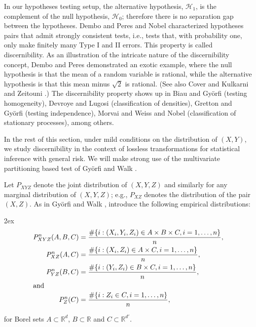\documentclass[11pt]{article}
\def\R{{\mathbb R}}
\begin{document}
In our hypotheses testing setup, the alternative hypothesis, $\mathcal{H}_1$, is the complement of the null hypothesis,  $\mathcal{H}_0$; 
therefore there is no separation gap between the hypotheses.
Dembo and Peres \cite{DePe94} and Nobel \cite{Nob06} characterized
hypotheses pairs that admit strongly  consistent tests, i.e.,  tests
that, with probability one, only make finitely many Type I and II
errors. 
This property is called discernibility.
As an illustration of the intricate nature of the discernibility concept,
Dembo and Peres \cite{DePe94} demonstrated an exotic example, where the null hypothesis is that the mean of a random variable is rational, while the alternative hypothesis is that this mean minus $\sqrt{2}$ is rational.
(See also  Cover \cite{Cov73} and Kulkarni and Zeitouni \cite{KuZe91}.)
The discernibility property shows up in
Biau and Gy\"orfi \cite{BiGy05} (testing homogeneity),
Devroye and Lugosi \cite{DeLu02} (classification of densities),
Gretton and Gy\"orfi \cite{GrGy10} (testing independence),
Morvai and Weiss \cite{MoWe21} and Nobel \cite{Nob06} (classification of stationary processes),
among others. 

In the rest of this section, under mild conditions on the distribution of $(X,Y)$, we study discernibility in the context of lossless transformations for statistical inference with general risk. We will  make strong use of the multivariate partitioning based test of  Gy\"orfi and Walk \cite{GyWa12}. 



Let $P_{XYZ}$ denote  the joint distribution of $(X,Y,Z)$  and similarly for any marginal distribution of  $(X,Y,Z)$; e.g., $P_{XZ}$ denotes the distribution of the pair $(X,Z)$. 
As in Gy\"orfi and Walk \cite{GyWa12}, introduce the following empirical distributions:
\begin{spreadlines}{2ex} 
\begin{align*}
P^n_{XYZ}(A,B,C) &=\frac{\#\{i : (X_i,Y_i,Z_i) \in A\times B\times C, i=1,
\ldots,n\}}{n}, \\
P^n_{XZ}(A,C)& =\frac{\#\{i : (X_i,Z_i) \in A\times C, i=1,
\ldots,n\}}{n}, \\ 
P^n_{YZ}(B,C) & = \frac{\#\{i : (Y_i,Z_{i}) \in B\times C, i=1,
\ldots,n\}}{n}, \\
\intertext{and} 
P^n_{Z}(C)& =\frac{\#\{i : Z_{i} \in C, i=1, \ldots,n\}}{n},
\end{align*} 
\end{spreadlines}
for Borel sets $A\subset \R^d$, $B\subset \R$ and $C\subset \R^{d'}$.
\end{document}
